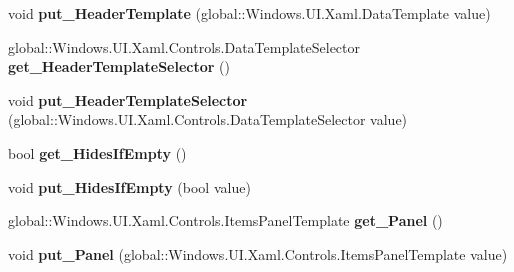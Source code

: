 \begin{DoxyCompactItemize}
\item 
\mbox{\label{interface_windows_1_1_u_i_1_1_xaml_1_1_controls_1_1_i_group_style_a740a71b8b3a99bb878e9ba66ebae7c4d}} 
void {\bfseries put\+\_\+\+Header\+Template} (global\+::\+Windows.\+U\+I.\+Xaml.\+Data\+Template value)
\item 
\mbox{\label{interface_windows_1_1_u_i_1_1_xaml_1_1_controls_1_1_i_group_style_a28c8a1b47d3dbd9c19e2499b6b78dd6b}} 
global\+::\+Windows.\+U\+I.\+Xaml.\+Controls.\+Data\+Template\+Selector {\bfseries get\+\_\+\+Header\+Template\+Selector} ()
\item 
\mbox{\label{interface_windows_1_1_u_i_1_1_xaml_1_1_controls_1_1_i_group_style_a7afe7db38684a1546bd50fa72f58ec53}} 
void {\bfseries put\+\_\+\+Header\+Template\+Selector} (global\+::\+Windows.\+U\+I.\+Xaml.\+Controls.\+Data\+Template\+Selector value)
\item 
\mbox{\label{interface_windows_1_1_u_i_1_1_xaml_1_1_controls_1_1_i_group_style_a9bc855cd77a4f2a8ba5d4c3e7c7174a9}} 
bool {\bfseries get\+\_\+\+Hides\+If\+Empty} ()
\item 
\mbox{\label{interface_windows_1_1_u_i_1_1_xaml_1_1_controls_1_1_i_group_style_aa1cde0010b3374a26237b4f39bcf3370}} 
void {\bfseries put\+\_\+\+Hides\+If\+Empty} (bool value)
\item 
\mbox{\label{interface_windows_1_1_u_i_1_1_xaml_1_1_controls_1_1_i_group_style_a0c9c3cde89c2eb82c05931ac6a601a16}} 
global\+::\+Windows.\+U\+I.\+Xaml.\+Controls.\+Items\+Panel\+Template {\bfseries get\+\_\+\+Panel} ()
\item 
\mbox{\label{interface_windows_1_1_u_i_1_1_xaml_1_1_controls_1_1_i_group_style_a54431a2fb424c8ee66764a90f1eb3a72}} 
void {\bfseries put\+\_\+\+Panel} (global\+::\+Windows.\+U\+I.\+Xaml.\+Controls.\+Items\+Panel\+Template value)

\end{DoxyCompactItemize}
